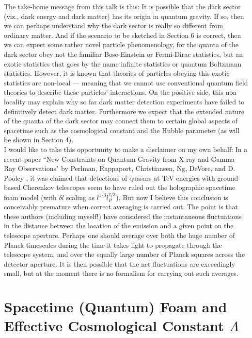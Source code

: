 \documentclass[a4paper]{jpconf}
\begin{document}
The take-home message from this talk is this:  It is possible that the dark 
sector (viz., dark energy and dark matter) has its origin in quantum gravity. 
If so, then we can perhaps understand why the dark sector is really so 
different from ordinary matter.  And if the scenario to be sketched in Section
6 is correct, then we can expect some rather novel particle phenomenology, 
for the quanta of the dark sector obey not the familiar Bose-Einstein or
Fermi-Dirac statistics, but an exotic statistics that goes by the name
infinite statistics \cite{DHR,govorkov,greenberg,fredenhagen}
or quantum Boltzmann statistics. \cite{plb,PRD}  However, it is known
that theories of particles obeying this exotic statistics are non-local ---
meaning that we cannot use conventional quantum field theories to describe
these particles' interactions.  On the positive side, this non-locality
may explain why so far dark matter detection experiments have failed 
to definitively detect dark matter.  Furthermore we expect that
the extended nature of the quanta of the dark sector may
connect them to certain global aspects of spacetime such as the cosmological
constant and the Hubble parameter (as will be shown in Section 4).
\\

I would like to take this opportunity to make a disclaimer on my own
behalf: In a recent paper
``New Constraints on Quantum Gravity from X-ray and Gamma-Ray
Observations" by Perlman, Rappaport, Christiansen, Ng, DeVore, and
D. Pooley \cite{perlman15}, it was claimed that
detections of quasars at
TeV energies with ground-based Cherenkov
telescopes seem to have ruled out the holographic spacetime foam model
(with $\delta l$ scaling as $l^{1/3} l_P^{2/3}$).  But now I believe 
this conclusion is conceivably premature when correct averaging is carried out.
The point is that these authors (including myself!) have considered the 
instantaneous fluctuations in the distance
between the location of the emission and a given point on the telescope 
aperture.
Perhaps one should average over both the huge number of Planck timescales
during
the time it takes light to propagate through the telescope system, and over
the
equally large number of Planck squares across the detector aperture. It is
then possible that the net fluctuations are exceedingly small, but
at the moment there is no formalism for carrying out such averages.
\cite{perlman16} \\

%

\section{\bf {Spacetime (Quantum) Foam and Effective Cosmological Constant 
$\Lambda$}}
\end{document}
